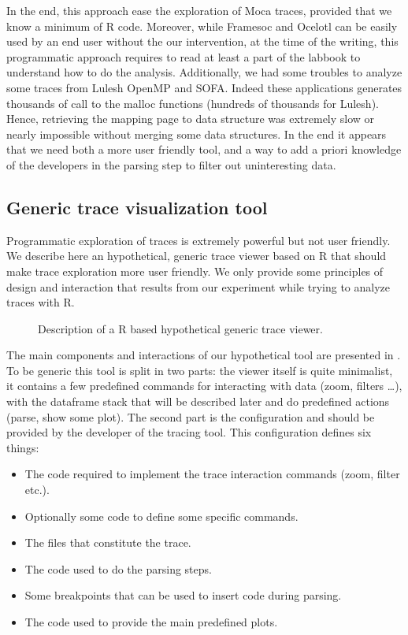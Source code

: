In the end, this approach ease the exploration of \gls{Moca} traces, provided that we know a minimum of \gls{R} code.
Moreover, while \gls{Framesoc} and \gls{Ocelotl} can be easily used by an end user without the our intervention, at the time of the writing, this programmatic approach requires to read at least a part of the labbook to understand how to do the analysis.
Additionally, we had some troubles to analyze some traces from Lulesh \gls{OpenMP} and \gls{SOFA}.
Indeed these applications generates thousands of call to the malloc functions (hundreds of thousands for Lulesh).
Hence, retrieving the mapping page to data structure was extremely slow or nearly impossible without merging some data structures.
In the end it appears that we need both a more user friendly tool, and a way to add a priori knowledge of the developers in the parsing step to filter out uninteresting data.

\subsection{Generic trace visualization tool}

Programmatic exploration of traces is extremely powerful but not user friendly.
We describe here an hypothetical, generic trace viewer based on \gls{R} that should make trace exploration more user friendly.
We only provide some principles of design and interaction that results from our experiment while trying to analyze traces with \gls{R}.

\begin{figure}[htb]
    \centering
    
    \caption{Description of a R based hypothetical generic trace viewer.}
    \label{fig:generic-viewer}
\end{figure}

The main components and interactions of our hypothetical tool are presented in .
To be generic this tool is split in two parts: the viewer itself is quite minimalist, it contains a few predefined commands for interacting with data (zoom, filters \ldots), with the dataframe stack that will be described later and do predefined actions (parse, show some plot).
The second part is the configuration and should be provided by the developer of the tracing tool.
This configuration defines six things:
\begin{itemize}
    \item The code required to implement the trace interaction commands (zoom, filter etc.).
    \item Optionally some code to define some specific commands.
    \item The files that constitute the trace.
    \item The code used to do the parsing steps.
    \item Some breakpoints that can be used to insert code during parsing.
    \item The code used to provide the main predefined plots.
\end{itemize}

